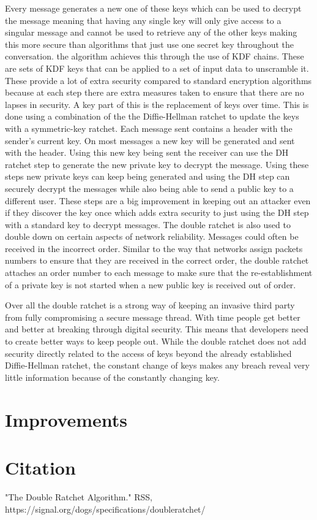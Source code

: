 \documentclass{article}
\begin{document}
Every message generates a new one of these keys which can be used to decrypt the message meaning that having any single key will only give access to a singular message and cannot be used to retrieve any of the other keys making this more secure than algorithms that just use one secret key throughout the conversation. the algorithm achieves this through the use of KDF chains. These are sets of KDF keys that can be applied to a set of input data to unscramble it. These provide a lot of extra security compared to standard encryption algorithms because at each step there are extra measures taken to ensure that there are no lapses in security. A key part of this is the replacement of keys over time. This is done using a combination of the the Diffie-Hellman ratchet to update the keys with a symmetric-key ratchet. Each message sent contains a header with the sender's current key. On most messages a new key will be generated and sent with the header. Using this new key being sent the receiver can use the DH ratchet step to generate the new private key to decrypt the message. Using these steps new private keys can keep being generated and using the DH step can securely decrypt the messages while also being able to send a public key to a different user. These steps are a big improvement in keeping out an attacker even if they discover the key once which adds extra security to just using the DH step with a standard key to decrypt messages.\newline
 The double ratchet is also used to double down on certain aspects of network reliability. Messages could often be received in the incorrect order. Similar to the way that networks assign packets numbers to ensure that they are received in the correct order, the double ratchet attaches an order number to each message to make sure that the re-establishment of a private key is not started when a new public key is received out of order.\newline
 
 Over all the double ratchet is a strong way of keeping an invasive third party from fully compromising a secure message thread. With time people get better and better at breaking through digital security. This means that developers need to create better ways to keep people out. While the double ratchet does not add security directly related to the access of keys beyond the already established Diffie-Hellman ratchet, the constant change of keys makes any breach reveal very little information because of the constantly changing key.\newline
 
 \section{Improvements}

    \begin{algorithm}
    \begin{algorithmic}

	\EndProcedure
    	\end{algorithmic}
    \end{algorithm}

\section{Citation}

"The Double Ratchet Algorithm." RSS, https://signal.org/dogs/specifications/doubleratchet/


    
	
	    
\end{document}
